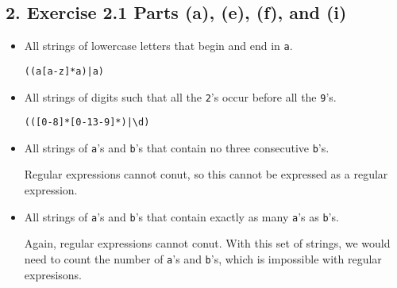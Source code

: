 \documentclass[12pt]{article}
\begin{document}
\subsection*{2. Exercise 2.1 Parts (a), (e), (f), and (i)}
\begin{itemize}
\item[a.] All strings of lowercase letters that begin and end in {\tt a}.
\begin{verbatim}((a[a-z]*a)|a)\end{verbatim}
\item[e.] All strings of digits such that all the {\tt 2}'s occur before all the {\tt 9}'s.
\begin{verbatim}(([0-8]*[0-13-9]*)|\d)\end{verbatim}
\item[f.] All strings of {\tt a}'s and {\tt b}'s that contain no three consecutive {\tt b}'s.

Regular expressions cannot conut, so this cannot be expressed as a regular expression.
\item[i.] All strings of {\tt a}'s and {\tt b}'s that contain exactly as many {\tt a}'s as {\tt b}'s.

Again, regular expressions cannot conut. With this set of strings, we would need to count the number of {\tt a}'s and {\tt b}'s, which is impossible with regular expresisons.
\begin{verbatim}\end{verbatim}
\end{itemize}
\end{document}
